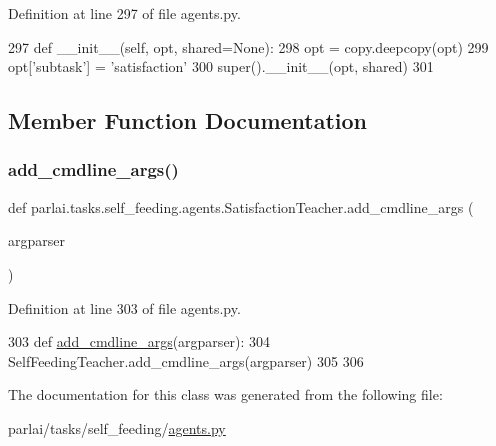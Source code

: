 Definition at line 297 of file agents.\+py.


\begin{DoxyCode}
297     \textcolor{keyword}{def }\_\_init\_\_(self, opt, shared=None):
298         opt = copy.deepcopy(opt)
299         opt[\textcolor{stringliteral}{'subtask'}] = \textcolor{stringliteral}{'satisfaction'}
300         super().\_\_init\_\_(opt, shared)
301 
\end{DoxyCode}


\subsection{Member Function Documentation}
\mbox{\label{classparlai_1_1tasks_1_1self__feeding_1_1agents_1_1SatisfactionTeacher_a600955877888a602a2d83396248bde1a}} 
\subsubsection{\texorpdfstring{add\+\_\+cmdline\+\_\+args()}{add\_cmdline\_args()}}
{\footnotesize\ttfamily def parlai.\+tasks.\+self\+\_\+feeding.\+agents.\+Satisfaction\+Teacher.\+add\+\_\+cmdline\+\_\+args (\begin{DoxyParamCaption}\item[{}]{argparser }\end{DoxyParamCaption})\hspace{0.3cm}{\ttfamily [static]}}



Definition at line 303 of file agents.\+py.


\begin{DoxyCode}
303     \textcolor{keyword}{def }\hyperlink{namespaceparlai_1_1agents_1_1drqa_1_1config_a62fdd5554f1da6be0cba185271058320}{add\_cmdline\_args}(argparser):
304         SelfFeedingTeacher.add\_cmdline\_args(argparser)
305 
306 
\end{DoxyCode}


The documentation for this class was generated from the following file\+:\begin{DoxyCompactItemize}
\item 
parlai/tasks/self\+\_\+feeding/\hyperlink{parlai_2tasks_2self__feeding_2agents_8py}{agents.\+py}\end{DoxyCompactItemize}
